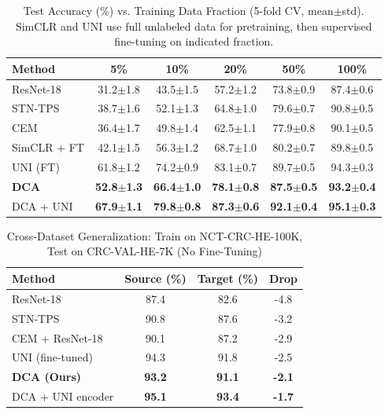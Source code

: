 \begin{table}[t]
\centering
\caption{Test Accuracy (\%) vs. Training Data Fraction (5-fold CV, mean$\pm$std). SimCLR and UNI use full unlabeled data for pretraining, then supervised fine-tuning on indicated fraction.}
\label{tab:data_efficiency}
\begin{tabularx}{\textwidth}{Xccccc}
\hline
\textbf{Method} & \textbf{5\%} & \textbf{10\%} & \textbf{20\%} & \textbf{50\%} & \textbf{100\%} \\
\hline
ResNet-18 & 31.2$\pm$1.8 & 43.5$\pm$1.5 & 57.2$\pm$1.2 & 73.8$\pm$0.9 & 87.4$\pm$0.6 \\
STN-TPS & 38.7$\pm$1.6 & 52.1$\pm$1.3 & 64.8$\pm$1.0 & 79.6$\pm$0.7 & 90.8$\pm$0.5 \\
CEM & 36.4$\pm$1.7 & 49.8$\pm$1.4 & 62.5$\pm$1.1 & 77.9$\pm$0.8 & 90.1$\pm$0.5 \\
SimCLR + FT & 42.1$\pm$1.5 & 56.3$\pm$1.2 & 68.7$\pm$1.0 & 80.2$\pm$0.7 & 89.8$\pm$0.5 \\
UNI (FT) & 61.8$\pm$1.2 & 74.2$\pm$0.9 & 83.1$\pm$0.7 & 89.7$\pm$0.5 & 94.3$\pm$0.3 \\
\textbf{DCA} & \textbf{52.8$\pm$1.3} & \textbf{66.4$\pm$1.0} & \textbf{78.1$\pm$0.8} & \textbf{87.5$\pm$0.5} & \textbf{93.2$\pm$0.4} \\
DCA + UNI & \textbf{67.9$\pm$1.1} & \textbf{79.8$\pm$0.8} & \textbf{87.3$\pm$0.6} & \textbf{92.1$\pm$0.4} & \textbf{95.1$\pm$0.3} \\
\hline
\end{tabularx}
\end{table}
\begin{table}[t]
\centering
\caption{Cross-Dataset Generalization: Train on NCT-CRC-HE-100K, Test on CRC-VAL-HE-7K (No Fine-Tuning)}
\label{tab:generalization}
\begin{tabularx}{\textwidth}{Xccc}
\hline
\textbf{Method} & \textbf{Source (\%)} & \textbf{Target (\%)} & \textbf{Drop} \\
\hline
ResNet-18 & 87.4 & 82.6 & -4.8 \\
STN-TPS & 90.8 & 87.6 & -3.2 \\
CEM + ResNet-18 & 90.1 & 87.2 & -2.9 \\
UNI (fine-tuned) & 94.3 & 91.8 & -2.5 \\
\textbf{DCA (Ours)} & \textbf{93.2} & \textbf{91.1} & \textbf{-2.1} \\
DCA + UNI encoder & \textbf{95.1} & \textbf{93.4} & \textbf{-1.7} \\
\hline
\end{tabularx}
\end{table}


